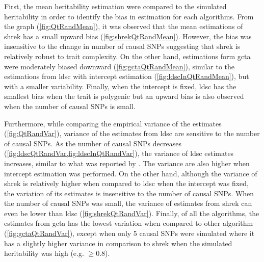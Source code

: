 \documentclass[12pt]{scrbook}
\begin{document}
First, the mean heritability estimation were compared to the simulated heritability in order to identify the bias in estimation for each algorithms.
From the graph (\cref{fig:QtRandMean}), it was observed that the mean estimations of \gls{shrek} has a small upward bias (\cref{fig:shrekQtRandMean}).
However, the bias was insensitive to the change in number of causal \glspl{SNP} suggesting that \gls{shrek} is relatively robust to trait complexity.
On the other hand, estimations form \gls{gcta} were moderately biased downward (\cref{fig:gctaQtRandMean}), similar to the estimations from \gls{ldsc} with intercept estimation (\cref{fig:ldscInQtRandMean}), but with a smaller variability.
Finally, when the intercept is fixed, \gls{ldsc} has the smallest bias when the trait is polygenic but an upward bias is also observed when the number of causal \glspl{SNP} is small.

Furthermore, while comparing the empirical variance of the estimates (\cref{fig:QtRandVar}), variance of the estimates from \gls{ldsc} are sensitive to the number of causal \glspl{SNP}.
As the number of causal \glspl{SNP} decreases (\cref{fig:ldscQtRandVar,fig:ldscInQtRandVar}), the variance of \gls{ldsc} estimates increases, similar to what was reported by \citet{Bulik-Sullivan2015}.
The variance are also higher when intercept estimation was performed. 
On the other hand, although the variance of \gls{shrek} is relatively higher when compared to \gls{ldsc} when the intercept was fixed, the variation of its estimates is insensitive to the number of causal \glspl{SNP}.
When the number of causal \glspl{SNP} was small, the variance of estimates from \gls{shrek} can even be lower than \gls{ldsc} (\cref{fig:shrekQtRandVar}).
Finally, of all the algorithms, the estimates from \gls{gcta} has the lowest variation when compared to other algorithm (\cref{fig:gctaQtRandVar}), except when only 5 causal \glspl{SNP} were simulated where it has a slightly higher variance in comparison to \gls{shrek} when the simulated heritability was high (e.g. $\ge 0.8$).
\end{document}
